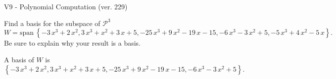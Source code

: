 \begin{exercise}
  \begin{exerciseTitle}V9 - Polynomial Computation (ver. 229)\end{exerciseTitle}
  \begin{exerciseStatement}
    Find a basis for the subspace of \(\mathcal{P}^3\) 
\[W=\mathrm{span}\ \left\{-3 \, x^{3} + 2 \, x^{2} , 3 \, x^{3} + x^{2} + 3 \, x + 5 , -25 \, x^{3} + 9 \, x^{2} - 19 \, x - 15 , -6 \, x^{3} - 3 \, x^{2} + 5 , -5 \, x^{3} + 4 \, x^{2} - 5 \, x\right\}.\]
 Be sure to explain why your result is a basis.


  \end{exerciseStatement}
  \begin{exerciseAnswer}
   A basis of \(W\) is  \(\left\{-3 \, x^{3} + 2 \, x^{2} , 3 \, x^{3} + x^{2} + 3 \, x + 5 , -25 \, x^{3} + 9 \, x^{2} - 19 \, x - 15 , -6 \, x^{3} - 3 \, x^{2} + 5\right\}\).
  


  \end{exerciseAnswer}
\end{exercise}